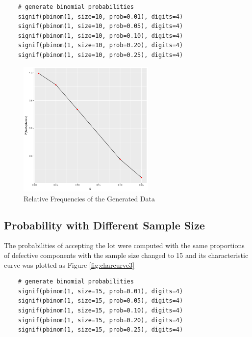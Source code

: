 \documentclass{article}
\begin{document}
\begin{lstlisting}
    # generate binomial probabilities
    signif(pbinom(1, size=10, prob=0.01), digits=4)
    signif(pbinom(1, size=10, prob=0.05), digits=4)
    signif(pbinom(1, size=10, prob=0.10), digits=4)
    signif(pbinom(1, size=10, prob=0.20), digits=4)
    signif(pbinom(1, size=10, prob=0.25), digits=4)
\end{lstlisting}

            \begin{figure}[h]
                \begin{center}
                    \includegraphics[width=0.6\textwidth]{figures/charcurve2.png}
                    \caption{Relative Frequencies of the Generated Data} \label{fig:charcurve2}
                \end{center}
            \end{figure}

        \subsection{Probability with Different Sample Size}
            The probabilities of accepting the lot were computed with the same proportions of defective components with the sample size changed to 15 and its characteristic curve was plotted as Figure \ref{fig:charcurve3}

\begin{lstlisting}
    # generate binomial probabilities
    signif(pbinom(1, size=15, prob=0.01), digits=4)
    signif(pbinom(1, size=15, prob=0.05), digits=4)
    signif(pbinom(1, size=15, prob=0.10), digits=4)
    signif(pbinom(1, size=15, prob=0.20), digits=4)
    signif(pbinom(1, size=15, prob=0.25), digits=4)
\end{lstlisting}
\end{document}
